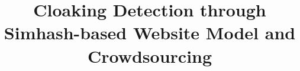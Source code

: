 \documentclass[letterpaper,twocolumn,10pt]{article}
\begin{document}
\date{}

\title{\Large \bf Cloaking Detection through Simhash-based Website Model and
Crowdsourcing}

\author{
}

%
%




\maketitle

\thispagestyle{empty}














\end{document}
